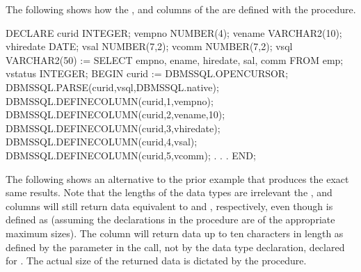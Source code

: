 \documentclass[letterpaper,10pt,english,openany,oneside]{sphinxmanual}
\begin{document}

The following shows how the , and 
columns of the  are defined with the  procedure.

%
\begin{sphinxVerbatim}[commandchars=\\\{\}]
DECLARE
    curid           INTEGER;
    v\PYGZus{}empno         NUMBER(4);
    v\PYGZus{}ename         VARCHAR2(10);
    v\PYGZus{}hiredate      DATE;
    v\PYGZus{}sal           NUMBER(7,2);
    v\PYGZus{}comm          NUMBER(7,2);
    v\PYGZus{}sql           VARCHAR2(50) := \PYGZsq{}SELECT empno, ename, hiredate, sal, \PYGZsq{} \textbar{}\textbar{}
                                    \PYGZsq{}comm FROM emp\PYGZsq{};
    v\PYGZus{}status        INTEGER;
BEGIN
    curid := DBMS\PYGZus{}SQL.OPEN\PYGZus{}CURSOR;
    DBMS\PYGZus{}SQL.PARSE(curid,v\PYGZus{}sql,DBMS\PYGZus{}SQL.native);
    DBMS\PYGZus{}SQL.DEFINE\PYGZus{}COLUMN(curid,1,v\PYGZus{}empno);
    DBMS\PYGZus{}SQL.DEFINE\PYGZus{}COLUMN(curid,2,v\PYGZus{}ename,10);
    DBMS\PYGZus{}SQL.DEFINE\PYGZus{}COLUMN(curid,3,v\PYGZus{}hiredate);
    DBMS\PYGZus{}SQL.DEFINE\PYGZus{}COLUMN(curid,4,v\PYGZus{}sal);
    DBMS\PYGZus{}SQL.DEFINE\PYGZus{}COLUMN(curid,5,v\PYGZus{}comm);
            .
            .
            .
END;
\end{sphinxVerbatim}

\newpage

The following shows an alternative to the prior example that produces
the exact same results. Note that the lengths of the data types are
irrelevant \textendash{} the , and  columns will still return data
equivalent to  and , respectively, even though
 is defined as  (assuming the declarations in the
 procedure are of the appropriate maximum sizes). The 
column will return data up to ten characters in length as defined by the
 parameter in the  call, not by the data type
declaration,  declared for . The actual size of the
returned data is dictated by the  procedure.
\end{document}
